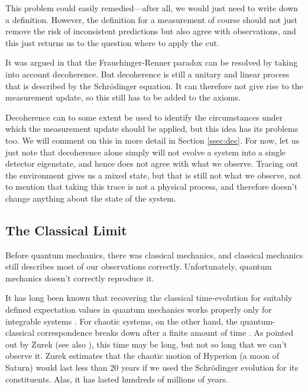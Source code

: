 \documentclass[superscriptaddress,floatfix,nofootinbib,12pt]{revtex4-2}
\begin{document}
This problem could easily remedied---after all, we would just need to write down a definition. However, the definition for a measurement of course should not just remove the risk of inconsistent predictions but also agree with observations, and this just returns us to the question where to apply the cut. 

It was argued in \cite{relano2018decoherence,zukowski2021physics} that the Frauchinger-Renner paradox can be resolved by taking into account decoherence. But decoherence is still a unitary and linear process that is described by the Schr\"odinger equation. It can therefore not give rise to the measurement update, so this still has to be added to the axioms. 

Decoherence can to some extent be used to identify the circumstances under which the measurement update should be applied, but this idea has its problems too. We will comment on this in more detail in Section \ref{ssec:dec}. For now, let us just note that decoherence alone simply will not evolve a system into a single detector eigenstate, and hence does not agree with what we observe. Tracing out the environment gives us a mixed state, but that is still not what we observe, not to mention that taking this trace is not a physical process, and therefore doesn't change anything about the state of the system.  
 
 \subsection{The Classical Limit}
 \label{sec:classical}
 
Before quantum mechanics, there was classical mechanics, and classical mechanics still describes most of our observations correctly. Unfortunately, quantum mechanics doesn't correctly reproduce it.

It has long been known that recovering the classical time-evolution for suitably defined expectation values in quantum mechanics works properly only for integrable systems \cite{berman1978condition,zaslavsky1981stochasticity}. For chaotic systems, on the other hand, the quantum-classical correspondence breaks down after a finite amount of time \cite{combescure1997semiclassical,bambusi1999long}. As pointed out by Zurek \cite{zurek2003decoherence} (see also \cite{berry2001chaos}), this time may be long, but not so long that we can't observe it. Zurek estimates that the chaotic motion of Hyperion (a moon of Saturn) would last less than 20 years if we used the Schr\"odinger evolution for its constituents. Alas, it has lasted hundreds of millions of years.
\end{document}

